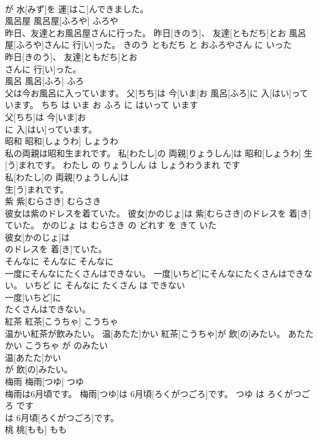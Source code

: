 \documentclass[8pt]{extreport}
\begin{document}
\begin{CJK}{UTF8}{min}
\\	が 水[みず]を 運[はこ]んできました。		
\\	風呂屋	風呂屋[ふろや]	ふろや	
\\	昨日、友達とお風呂屋さんに行った。	昨日[きのう]、 友達[ともだち]とお 風呂屋[ふろや]さんに 行[い]った。	きのう ともだち と おふろやさん に いった	
\\	昨日[きのう]、 友達[ともだち]とお
\\	さんに 行[い]った。		
\\	風呂	風呂[ふろ]	ふろ	
\\	父は今お風呂に入っています。	父[ちち]は 今[いま]お 風呂[ふろ]に 入[はい]っています。	ちち は いま お ふろ に はいって います	
\\	父[ちち]は 今[いま]お
\\	に 入[はい]っています。		
\\	昭和	昭和[しょうわ]	しょうわ	
\\	私の両親は昭和生まれです。	私[わたし]の 両親[りょうしん]は 昭和[しょうわ] 生[う]まれです。	わたし の りょうしん は しょうわうまれ です	
\\	私[わたし]の 両親[りょうしん]は
\\	生[う]まれです。		
\\	紫	紫[むらさき]	むらさき	
\\	彼女は紫のドレスを着ていた。	彼女[かのじょ]は 紫[むらさき]のドレスを 着[き]ていた。	かのじょ は むらさき の どれす を きて いた	
\\	彼女[かのじょ]は
\\	のドレスを 着[き]ていた。		
\\	そんなに	そんなに	そんなに	
\\	一度にそんなにたくさんはできない。	一度[いちど]にそんなにたくさんはできない。	いちど に そんなに たくさん は できない	
\\	一度[いちど]に
\\	たくさんはできない。		
\\	紅茶	紅茶[こうちゃ]	こうちゃ	
\\	温かい紅茶が飲みたい。	温[あたた]かい 紅茶[こうちゃ]が 飲[の]みたい。	あたたかい こうちゃ が のみたい	
\\	温[あたた]かい
\\	が 飲[の]みたい。		
\\	梅雨	梅雨[つゆ]	つゆ	
\\	梅雨は6月頃です。	梅雨[つゆ]は 6月頃[ろくがつごろ]です。	つゆ は ろくがつごろ です	
\\	は 6月頃[ろくがつごろ]です。		
\\	桃	桃[もも]	もも	

\end{CJK}
\end{document}
